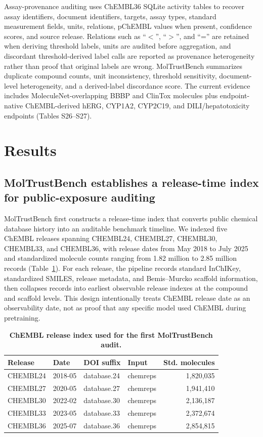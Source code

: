 \documentclass[unnumsec,webpdf,contemporary,large,numbered]{oup-authoring-template}
\begin{document}
Assay-provenance auditing uses ChEMBL36 SQLite activity tables to recover assay identifiers, document identifiers, targets, assay types, standard measurement fields, units, relations, pChEMBL values when present, confidence scores, and source release. Relations such as ``$<$'', ``$>$'', and ``='' are retained when deriving threshold labels, units are audited before aggregation, and discordant threshold-derived label calls are reported as provenance heterogeneity rather than proof that original labels are wrong. MolTrustBench summarizes duplicate compound counts, unit inconsistency, threshold sensitivity, document-level heterogeneity, and a derived-label discordance score. The current evidence includes MoleculeNet-overlapping BBBP and ClinTox molecules plus endpoint-native ChEMBL-derived hERG, CYP1A2, CYP2C19, and DILI/hepatotoxicity endpoints (Tables S26--S27).

\section{Results}

\subsection{MolTrustBench establishes a release-time index for public-exposure auditing}

MolTrustBench first constructs a release-time index that converts public chemical database history into an auditable benchmark timeline. We indexed five ChEMBL releases spanning CHEMBL24, CHEMBL27, CHEMBL30, CHEMBL33, and CHEMBL36, with release dates from May 2018 to July 2025 and standardized molecule counts ranging from 1.82 million to 2.85 million records (Table~\ref{tab:chembl-releases}). For each release, the pipeline records standard InChIKey, standardized SMILES, release metadata, and Bemis--Murcko scaffold information, then collapses records into earliest observable release indexes at the compound and scaffold levels. This design intentionally treats ChEMBL release date as an observability date, not as proof that any specific model used ChEMBL during pretraining.

\begin{table}[!t]
\caption{\textbf{ChEMBL release index used for the first MolTrustBench audit.}}
\label{tab:chembl-releases}
\begin{tabular*}{\columnwidth}{@{\extracolsep\fill}llllr}
\toprule
Release & Date & DOI suffix & Input & Std. molecules \\
\midrule
CHEMBL24 & 2018-05 & database.24 & chemreps & 1,820,035 \\
CHEMBL27 & 2020-05 & database.27 & chemreps & 1,941,410 \\
CHEMBL30 & 2022-02 & database.30 & chemreps & 2,136,187 \\
CHEMBL33 & 2023-05 & database.33 & chemreps & 2,372,674 \\
CHEMBL36 & 2025-07 & database.36 & chemreps & 2,854,815 \\
\bottomrule
\end{tabular*}
\end{table}
\end{document}

